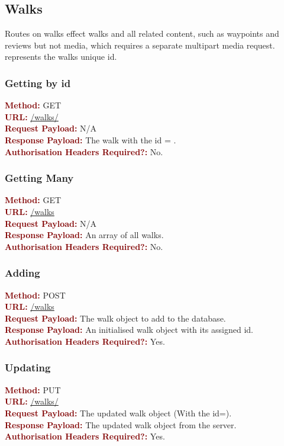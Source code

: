 \documentclass[11pt,a4paper]{report}
\begin{document}
\subsection{Walks}

Routes on walks effect walks and all related content, such as waypoints and reviews but not media, which requires a separate multipart media request.  represents the walks unique id.

\subsubsection{Getting by id}
\textbf{\textcolor{Maroon}{Method:}} GET\\
\textbf{\textcolor{Maroon}{URL:}} \url{/walks/}\\
\textbf{\textcolor{Maroon}{Request Payload:}} N/A\\
\textbf{\textcolor{Maroon}{Response Payload:}} The walk with the id = .\\
\textbf{\textcolor{Maroon}{Authorisation Headers Required?:}} No.

\subsubsection{Getting Many}
\textbf{\textcolor{Maroon}{Method:}} GET\\
\textbf{\textcolor{Maroon}{URL:}} \url{/walks}\\
\textbf{\textcolor{Maroon}{Request Payload:}} N/A\\
\textbf{\textcolor{Maroon}{Response Payload:}} An array of all walks.\\
\textbf{\textcolor{Maroon}{Authorisation Headers Required?:}} No.

\subsubsection{Adding}
\textbf{\textcolor{Maroon}{Method:}} POST\\
\textbf{\textcolor{Maroon}{URL:}} \url{/walks}\\
\textbf{\textcolor{Maroon}{Request Payload:}} The walk object to add to the database.\\
\textbf{\textcolor{Maroon}{Response Payload:}} An initialised walk object with its assigned id.\\
\textbf{\textcolor{Maroon}{Authorisation Headers Required?:}} Yes.

\subsubsection{Updating}
\textbf{\textcolor{Maroon}{Method:}} PUT\\
\textbf{\textcolor{Maroon}{URL:}} \url{/walks/}\\
\textbf{\textcolor{Maroon}{Request Payload:}} The updated walk object (With the id=).\\
\textbf{\textcolor{Maroon}{Response Payload:}} The updated walk object from the server.\\
\textbf{\textcolor{Maroon}{Authorisation Headers Required?:}} Yes.
\end{document}
